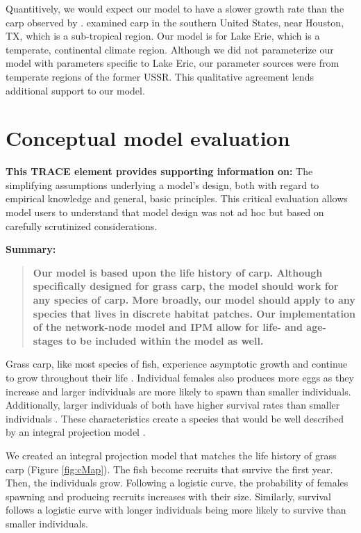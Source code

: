 \documentclass{article}[12pt]
\begin{document}
Quantitively, we would expect our model to have a slower growth rate than the carp observed by \citet{martyn1986mapping}.
\citet{martyn1986mapping} examined carp in the southern United States, near Houston, TX, which is a sub-tropical region.
Our model is for Lake Erie, which is a temperate, continental climate region.
Although we did not parameterize our model with parameters specific to Lake Eric, our parameter sources were from temperate regions of the former USSR. 
This qualitative agreement lends additional support to our model. 


\section{Conceptual model evaluation}
\textbf{This TRACE element provides supporting information on:} The simplifying assumptions underlying a model's design, both with regard to empirical knowledge and general, basic principles. This critical evaluation allows model users to understand that model design was not ad hoc but based on carefully scrutinized considerations. 

\textbf{Summary:}
\begin{verse}
\textbf{
Our model is based upon the life history of carp.
Although specifically designed for grass carp, the model should work for any species of carp.
More broadly, our model should apply to any species that lives in discrete habitat patches.
Our implementation of the network-node model and IPM allow for life- and age-stages to be included within the model as well. 
} 
\end{verse}

Grass carp, like most species of fish, experience asymptotic growth and continue to grow throughout their life  \citep{lagler1962john}.
Individual females also produces more eggs as they increase and larger individuals are more likely to spawn than smaller individuals.
Additionally, larger individuals of both have higher survival rates than smaller individuals \citep{shireman1983synopsis}. 
These characteristics create a species that would be well described by an integral projection model \citep{ellner2006integral, ramula2009integral, merow2014advancing}.  

We created an integral projection model that matches the life history of grass carp (Figure \ref{fig:cMap}).
The fish become recruits that survive the first year.
Then, the individuals grow. 
Following a logistic curve, the probability of females spawning and producing recruits increases with their size. 
Similarly, survival follows a logistic curve with longer individuals being more likely to survive than smaller individuals.
\end{document}
